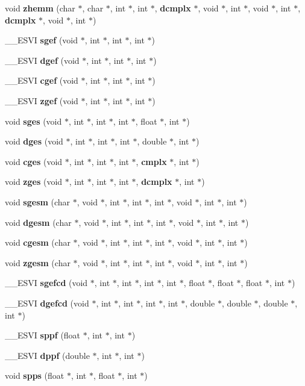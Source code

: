 \begin{CompactItemize}
\item 
void {\bf zhemm} (char $\ast$, char $\ast$, int $\ast$, int $\ast$, {\bf dcmplx} $\ast$, void $\ast$, int $\ast$, void $\ast$, int $\ast$, {\bf dcmplx} $\ast$, void $\ast$, int $\ast$)
\item 
\_\-\_\-ESVI {\bf sgef} (void $\ast$, int $\ast$, int $\ast$, int $\ast$)
\item 
\_\-\_\-ESVI {\bf dgef} (void $\ast$, int $\ast$, int $\ast$, int $\ast$)
\item 
\_\-\_\-ESVI {\bf cgef} (void $\ast$, int $\ast$, int $\ast$, int $\ast$)
\item 
\_\-\_\-ESVI {\bf zgef} (void $\ast$, int $\ast$, int $\ast$, int $\ast$)
\item 
void {\bf sges} (void $\ast$, int $\ast$, int $\ast$, int $\ast$, float $\ast$, int $\ast$)
\item 
void {\bf dges} (void $\ast$, int $\ast$, int $\ast$, int $\ast$, double $\ast$, int $\ast$)
\item 
void {\bf cges} (void $\ast$, int $\ast$, int $\ast$, int $\ast$, {\bf cmplx} $\ast$, int $\ast$)
\item 
void {\bf zges} (void $\ast$, int $\ast$, int $\ast$, int $\ast$, {\bf dcmplx} $\ast$, int $\ast$)
\item 
void {\bf sgesm} (char $\ast$, void $\ast$, int $\ast$, int $\ast$, int $\ast$, void $\ast$, int $\ast$, int $\ast$)
\item 
void {\bf dgesm} (char $\ast$, void $\ast$, int $\ast$, int $\ast$, int $\ast$, void $\ast$, int $\ast$, int $\ast$)
\item 
void {\bf cgesm} (char $\ast$, void $\ast$, int $\ast$, int $\ast$, int $\ast$, void $\ast$, int $\ast$, int $\ast$)
\item 
void {\bf zgesm} (char $\ast$, void $\ast$, int $\ast$, int $\ast$, int $\ast$, void $\ast$, int $\ast$, int $\ast$)
\item 
\_\-\_\-ESVI {\bf sgefcd} (void $\ast$, int $\ast$, int $\ast$, int $\ast$, int $\ast$, float $\ast$, float $\ast$, float $\ast$, int $\ast$)
\item 
\_\-\_\-ESVI {\bf dgefcd} (void $\ast$, int $\ast$, int $\ast$, int $\ast$, int $\ast$, double $\ast$, double $\ast$, double $\ast$, int $\ast$)
\item 
\_\-\_\-ESVI {\bf sppf} (float $\ast$, int $\ast$, int $\ast$)
\item 
\_\-\_\-ESVI {\bf dppf} (double $\ast$, int $\ast$, int $\ast$)
\item 
void {\bf spps} (float $\ast$, int $\ast$, float $\ast$, int $\ast$)

\end{CompactItemize}
